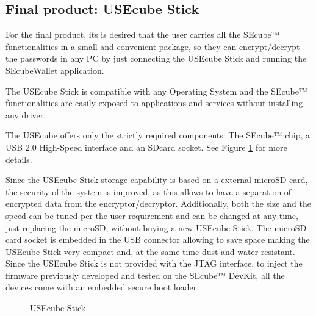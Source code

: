\subsection{Final product: USEcube Stick}

For the final product, its is desired that the user carries all the SEcube™ functionalities in a small and convenient package, so they can encrypt/decrypt the passwords in any PC by just connecting the USEcube Stick and running the SEcubeWallet application.

The USEcube Stick is compatible with any Operating System and the SEcube™ functionalities are easily exposed to applications and services without installing any driver.

The USEcube offers only the strictly required components: The SEcube™ chip, a USB 2.0 High-Speed interface and an SDcard socket. See Figure \ref{fig:USEcube} for more details.


Since the USEcube Stick storage capability is based on a external microSD card, the security of the system is improved, as this allows to have a separation of encrypted data from the encryptor/decryptor. Additionally, both the size and the speed can be tuned per the user requirement and can be changed at any time, just replacing the microSD, without buying a new USEcube Stick.
The microSD card socket is embedded in the USB connector allowing to save space making the USEcube Stick very compact and, at the same time dust
and water-resistant.
Since the USEcube Stick is not provided with the JTAG interface, to inject the firmware previously developed and tested on the SEcube™ DevKit, all the devices come with an embedded secure boot loader.


\begin{figure}[ht]
  \centering
  \caption{USEcube Stick}
 \label{fig:USEcube}
\end{figure}

